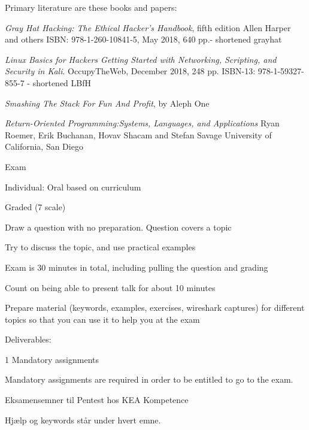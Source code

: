 \documentclass[Screen16to9,17pt]{foils}
\begin{document}

Primary literature are these books and papers:
\begin{list2}
\item \emph{Gray Hat Hacking: The Ethical Hacker's Handbook}, fifth edition
Allen Harper and others
ISBN: 978-1-260-10841-5, May 2018, 640 pp.- shortened grayhat
\item \emph{Linux Basics for Hackers Getting Started with Networking, Scripting, and Security in Kali}. OccupyTheWeb, December 2018, 248 pp. ISBN-13: 978-1-59327-855-7 - shortened LBfH
\item \emph{Smashing The Stack For Fun And Profit}, by Aleph One
\item \emph{Return-Oriented Programming:Systems, Languages, and Applications}
Ryan Roemer, Erik Buchanan, Hovav Shacam and Stefan Savage University of California, San Diego

\end{list2}




\begin{list2}
\item Exam
\item Individual: Oral based on curriculum
\item Graded (7 scale)
\item Draw a question with no preparation. Question covers a topic
\item Try to discuss the topic, and use practical examples
\item Exam is 30 minutes in total, including pulling the question and grading
\item Count on being able to present talk for about 10 minutes
\item Prepare material (keywords, examples, exercises, wireshark captures) for different topics so that you can use it to help you at the exam

\vskip 5mm
\item Deliverables:
\item 1 Mandatory assignments
\item Mandatory assignments are required in order to be entitled to go to the exam.
\end{list2}


Eksamensemner til Pentest hos KEA Kompetence

Hjælp og keywords står under hvert emne.
\end{document}
